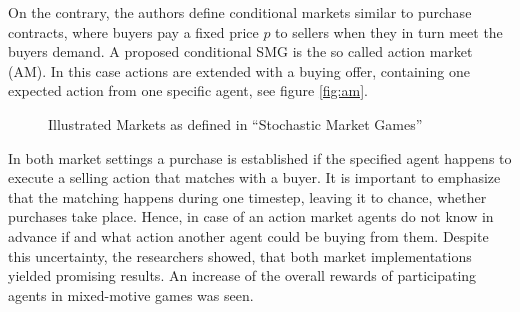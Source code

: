 On the contrary, the authors define conditional markets similar to purchase contracts, where buyers pay a fixed price $p$ to sellers when they in turn meet the buyers demand. A proposed conditional SMG is the so called action market (AM). In this case actions are extended with a buying offer, containing one expected action from one specific agent, see figure \ref{fig:am}.


\begin{figure}[hpbt]
    \centering
    \hspace{0.01\textwidth}
    \caption[Illustrated Markets]{Illustrated Markets as defined in ``Stochastic Market Games''\cite{scbe21}}
    \label{fig:multipic} %
\end{figure}

In both market settings a purchase is established if the specified agent happens to execute a selling action that matches with a buyer. It is important to emphasize that the matching happens during one timestep, leaving it to chance, whether purchases take place. Hence, in case of an action market agents do not know in advance if and what action another agent could be buying from them. Despite this uncertainty, the researchers showed, that both market implementations yielded promising results. An increase of the overall rewards of participating agents in mixed-motive games was seen.